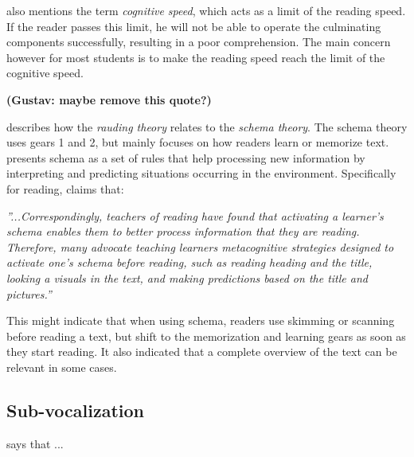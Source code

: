\citeauthor{carver_reading_1992} also mentions the term \textit{cognitive speed}, which acts as a limit of the reading speed. If the reader passes this limit, he will not be able to operate the culminating components successfully, resulting in a poor comprehension. The main concern however for most students is to make the reading speed reach the limit of the cognitive speed.

\textbf{(Gustav: maybe remove this quote?)}

\citeauthor{carver_reading_1992} describes how the \textit{rauding theory} relates to the \textit{schema theory}. The schema theory uses gears 1 and 2, but mainly focuses on how readers learn or memorize text.  presents schema as a set of rules that help processing new information by interpreting and predicting situations occurring in the environment. Specifically for reading, \citeauthor{widmayer_schema_2005} claims that:

 \emph{''...Correspondingly, teachers of reading have found that activating a learner's schema enables them to better process information that they are reading. Therefore, many advocate teaching learners metacognitive strategies designed to activate one's schema before reading, such as reading heading and the title, looking a visuals in the text, and making predictions based on the title and pictures.''}

This might indicate that when using schema, readers use skimming or scanning before reading a text, but shift to the memorization and learning gears as soon as they start reading. It also indicated that a complete overview of the text can be relevant in some cases.


\subsection{Sub-vocalization}
 says that ...
